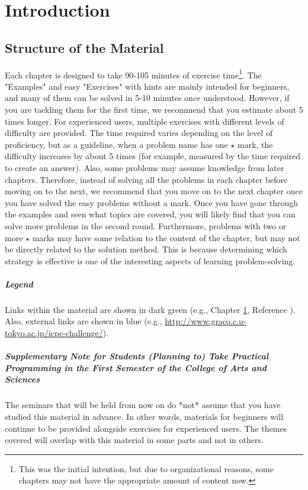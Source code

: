 \chapter{Introduction}\label{chapter:introduction}
\section{Structure of the Material}

Each chapter is designed to take 90-105 minutes of exercise time\footnote{This was the initial intention, but due to organizational reasons, some chapters may not have the appropriate amount of content now.}.
The "Examples" and easy "Exercises" with hints are mainly intended for beginners, and many of them can be solved in 5-10 minutes once understood. However, if you are tackling them for the first time, we recommend that you estimate about 5 times longer.
For experienced users, multiple exercises with different levels of difficulty are provided. The time required varies depending on the level of proficiency, but as a guideline, when a problem name has one $\star$ mark, the difficulty increases by about 5 times (for example, measured by the time required to create an answer). Also, some problems may assume knowledge from later chapters. Therefore, instead of solving all the problems in each chapter before moving on to the next, we recommend that you move on to the next chapter once you have solved the easy problems without a mark. Once you have gone through the examples and seen what topics are covered, you will likely find that you can solve more problems in the second round. Furthermore, problems with two or more $\star$ marks may have some relation to the content of the chapter, but may not be directly related to the solution method. This is because determining which strategy is effective is one of the interesting aspects of learning problem-solving.

\paragraph{Legend}
Links within the material are shown in dark green (e.g., Chapter \ref{chapter:introduction}, Reference \cite{book:pcc}).
Also, external links are shown in blue (e.g., \url{http://www.graco.c.u-tokyo.ac.jp/icpc-challenge/}).

\paragraph{Supplementary Note for Students (Planning to) Take Practical Programming in the First Semester of the College of Arts and Sciences}
The seminars that will be held from now on do *not* assume that you have studied this material in advance. In other words, materials for beginners will continue to be provided alongside exercises for experienced users. The themes covered will overlap with this material in some parts and not in others.
